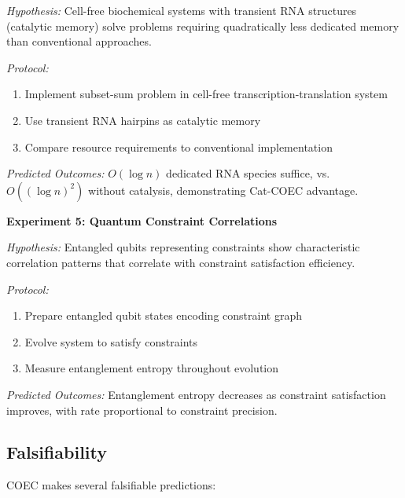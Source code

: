 \documentclass[11pt]{article}
\begin{document}
\textit{Hypothesis:} Cell-free biochemical systems with transient RNA structures (catalytic memory) solve problems requiring quadratically less dedicated memory than conventional approaches.

\textit{Protocol:}
\begin{enumerate}
\item Implement subset-sum problem in cell-free transcription-translation system
\item Use transient RNA hairpins as catalytic memory
\item Compare resource requirements to conventional implementation
\end{enumerate}

\textit{Predicted Outcomes:}
$O(\log n)$ dedicated RNA species suffice, vs. $O((\log n)^2)$ without catalysis, demonstrating Cat-COEC advantage.

\textbf{Experiment 5: Quantum Constraint Correlations}

\textit{Hypothesis:} Entangled qubits representing constraints show characteristic correlation patterns that correlate with constraint satisfaction efficiency.

\textit{Protocol:}
\begin{enumerate}
\item Prepare entangled qubit states encoding constraint graph
\item Evolve system to satisfy constraints
\item Measure entanglement entropy throughout evolution
\end{enumerate}

\textit{Predicted Outcomes:}
Entanglement entropy decreases as constraint satisfaction improves, with rate proportional to constraint precision.

\subsection{Falsifiability}

COEC makes several falsifiable predictions:
\end{document}
